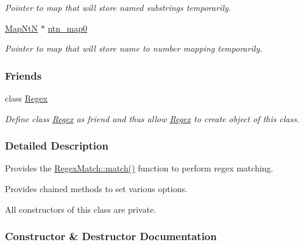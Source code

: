 \begin{DoxyCompactItemize}
\begin{DoxyCompactList}\small\item\em Pointer to map that will store named substrings temporarily. \end{DoxyCompactList}\item 
\hypertarget{classjpcre2_1_1RegexMatch_a1c790683d023313967ce80db6045419f}{}\label{classjpcre2_1_1RegexMatch_a1c790683d023313967ce80db6045419f} 
\hyperlink{namespacejpcre2_a753ebedfb8caf4a16ffbf47d8d705656}{Map\+NtN} $\ast$ \hyperlink{classjpcre2_1_1RegexMatch_a1c790683d023313967ce80db6045419f}{ntn\+\_\+map0}
\begin{DoxyCompactList}\small\item\em Pointer to map that will store name to number mapping temporarily. \end{DoxyCompactList}\end{DoxyCompactItemize}
\subsubsection*{Friends}
\begin{DoxyCompactItemize}
\item 
\hypertarget{classjpcre2_1_1RegexMatch_a1f6f7620b7d2218c6c2a6a47f432ea6a}{}\label{classjpcre2_1_1RegexMatch_a1f6f7620b7d2218c6c2a6a47f432ea6a} 
class \hyperlink{classjpcre2_1_1RegexMatch_a1f6f7620b7d2218c6c2a6a47f432ea6a}{Regex}
\begin{DoxyCompactList}\small\item\em Define class \hyperlink{classjpcre2_1_1Regex}{Regex} as friend and thus allow \hyperlink{classjpcre2_1_1Regex}{Regex} to create object of this class. \end{DoxyCompactList}\end{DoxyCompactItemize}


\subsubsection{Detailed Description}
Provides the \hyperlink{classjpcre2_1_1RegexMatch_a5868aef3a146594ea1ebef34d122bb33_a5868aef3a146594ea1ebef34d122bb33}{Regex\+Match\+::match()} function to perform regex matching. 

Provides chained methods to set various options.

All constructors of this class are private. 

\subsubsection{Constructor \& Destructor Documentation}
\hypertarget{classjpcre2_1_1RegexMatch_a40127e5057e2343848d8c8a6d4c32bcd_a40127e5057e2343848d8c8a6d4c32bcd}{}\label{classjpcre2_1_1RegexMatch_a40127e5057e2343848d8c8a6d4c32bcd_a40127e5057e2343848d8c8a6d4c32bcd} 
